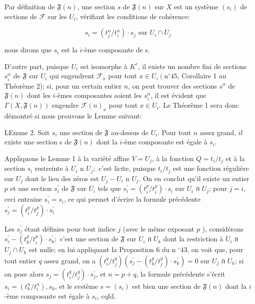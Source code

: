 Par définition de $\mathfrak{F}(n)$, une section $s$ de $\mathfrak{F}(n)$ sur $X$ est un système $\left(s_{i}\right)$ de sections de $\mathcal{F}$ sur les $U_{i}$, vérifiant les conditions de cohérence:

$$
s_{i}=\left(t_{j}^{n} / t_{i}^{n}\right) \cdot s_{j} \text { sur } U_{i} \cap U_{j}
$$

nous dirons que $s_{i}$ est la $i$-ème composante de s.

D'autre part, puisque $U_{i}$ est isomorphe à $K^{r}$, il existe un nombre fini de sections $s_{i}^{\alpha}$ de $\mathfrak{F}$ sur $U_{i}$ qui engendrent $\mathcal{F}_{x}$ pour tout $x \in U_{i}\left(\mathrm{n}^{\circ} 45\right.$, Corollaire 1 au Théorème 2); si, pour un certain entier $n$, on peut trouver des sections $s^{\alpha}$ de $\mathfrak{F}(n)$ dont les $i$-èmes composantes soient les $s_{i}^{\alpha}$, il est évident que $\Gamma(X, \mathfrak{F}(n))$ engendre $\mathcal{F}(n)_{x}$ pour tout $x \in U_{i} .$ Le Théorème 1 sera donc démontré si nous prouvons le Lemme suivant:

LEmme 2. Soit $s_{i}$ une section de $\mathfrak{F}$ au-dessus de $U_{i}$. Pour tout $n$ assez grand, $i l$ existe une section s de $\mathfrak{F}(n)$ dont la $i$-ème composante est égale à $s_{i}$.

Appliquons le Lemme 1 à la variété affine $V=U_{j}$, à la fonction $Q=t_{i} / t_{j}$ et à la section $s_{i}$ restreinte à $U_{i}$ n $U_{j} ;$ c'est licite, puisque $t_{i} / t_{j}$ est une fonction régulière sur $U_{j}$ dont le lieu des zéros est $U_{j}-U_{i}$ n $U_{j} .$ On en conclut qu'il existe un entier $p$ et une section $s_{i}^{\prime}$ de $\mathfrak{F}$ sur $U_{i}$ tels que $s_{i}^{\prime}=\left(t_{i}^{p} / t_{i}^{p}\right) \cdot s_{i}$ sur $U_{i}$ ก $U_{j}$; pour $j=i$, ceci entraine $s_{i}^{\prime}=s_{i}$, ce qui permet d'écrire la formule précédente $s_{j}^{\prime}=\left(t_{i}^{p} / t_{j}^{p}\right) \cdot s_{i}^{\prime}$

Les $s_{j}^{\prime}$ étant définies pour tout indice $j$ (avec le même exposant $p$ ), considérons $s_{i}^{\prime}-\left(t_{k}^{p} / t_{i}^{p}\right) \cdot s_{k}^{\prime} ;$ c'est une section de $\mathfrak{F}$ sur $U_{i}$ ก $U_{k}$ dont la restriction à $U_{i}$ ก $U_{j} \cap U_{k}$ est nulle; en lui appliquant la Proposition 6 du n $^{\circ} 43$, on voit que, pour tout entier $q$ assez grand, on a $\left(t_{i}^{q} / t_{j}^{q}\right)\left(s_{j}^{\prime}-\left(t_{k}^{p} / t_{j}^{p}\right) \cdot s_{k}^{\prime}\right)=0$ sur $U_{j}$ ก $U_{k}$; si on pose alors $s_{j}=\left(t_{i}^{q} / t_{j}^{q}\right) \cdot s_{j}^{\prime}$, et $n=p+q$, la formule précédente s'écrit $s_{i}=\left(t_{k}^{n} / t_{i}^{n}\right), s_{k}$, et le svstème $s=\left(s_{i}\right)$ est bien une section de $\mathfrak{F}(n)$ dont la $i$-ème composante est égale à $s_{i}$, cqfd.

